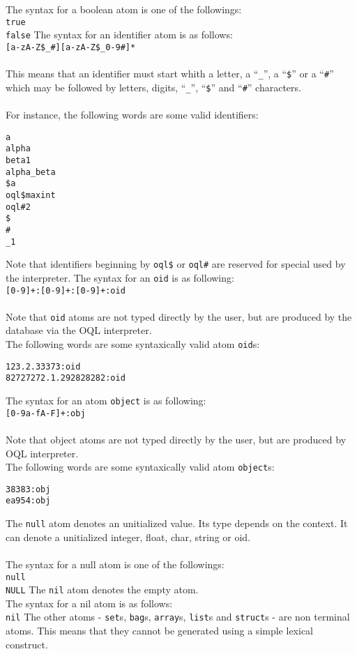 The syntax for a boolean atom is one of the followings:\\
\texttt{true}\\
\texttt{false}
The syntax for an identifier atom is as follows:\\
\texttt{[a-zA-Z{\bks}\$\_\#][a-zA-Z{\bks}\$\_0-9\#]*}\\
\\
This means that an identifier must start whith a letter, a ``\texttt{\_}'',
a ``\texttt{\$}'' or a ``\texttt{\#}'' which may be followed by letters, digits,
``\texttt{\_}'', ``\texttt{\$}'' and ``\texttt{\#}'' characters.\\
\\
For instance, the following words are some valid identifiers:
\verbsize
\begin{verbatim}
a
alpha
beta1
alpha_beta
$a
oql$maxint
oql#2
$
#
_1
\end{verbatim}
\normalsize
Note that identifiers beginning by \texttt{oql\$} or \texttt{oql\#} are
reserved for special used by the interpreter.
The syntax for an \texttt{oid} is as following:\\
\texttt{[0-9]+:[0-9]+:[0-9]+:oid}\\
\\
Note that \texttt{oid} atoms are not typed directly by the user, but are produced
by the database via the OQL interpreter.
\\
The following words are some syntaxically valid atom \texttt{oid}s:
\verbsize
\begin{verbatim}
123.2.33373:oid
82727272.1.292828282:oid
\end{verbatim}
\normalsize
{}
The syntax for an atom \texttt{object} is as following:\\
\texttt{[0-9a-fA-F]+:obj}\\
\\
Note that object atoms are not typed directly by the user, but are produced
by OQL interpreter.
\\
The following words are some syntaxically valid atom \texttt{object}s:
\verbsize
\begin{verbatim}
38383:obj
ea954:obj
\end{verbatim}
\normalsize
{}
The \texttt{null} atom denotes an unitialized value. Its type depends on the context.
It can denote a unitialized integer, float, char, string or oid.
\\
\\
The syntax for a null atom is one of the followings:\\
\texttt{null}\\
\texttt{NULL}
The \texttt{nil} atom denotes the empty atom.\\
The syntax for a nil atom is as follows:\\
\texttt{nil}
The other atoms - \texttt{set}s, \texttt{bag}s, \texttt{array}s,
\texttt{list}s and \texttt{struct}s - are non terminal
atoms. This means that they cannot be generated using a simple lexical
construct.


